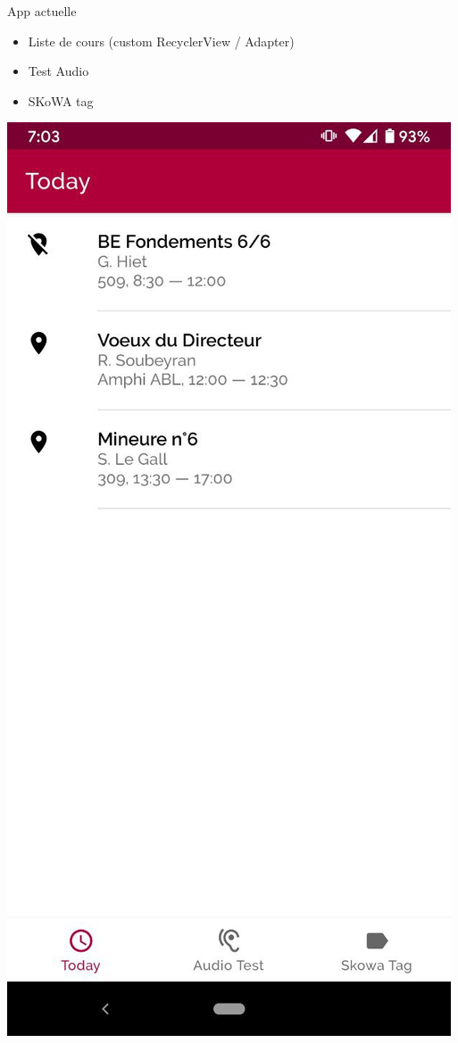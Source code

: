 \documentclass[aspectratio=169]{beamer}
\begin{document}
\begin{frame}{App actuelle}

  \begin{minipage}{.4\textwidth}
    \begin{itemize}
      \item Liste de cours (custom RecyclerView / Adapter)
      \item Test Audio
      \item SKoWA tag
    \end{itemize}
  \end{minipage}%
  \begin{minipage}{.3\textwidth}
    \centering
    \includegraphics[width=.7\linewidth]{../assets/android1}
  \end{minipage}%
  \begin{minipage}{.3\textwidth}
    \centering

\end{minipage}
\end{frame}
\end{document}
